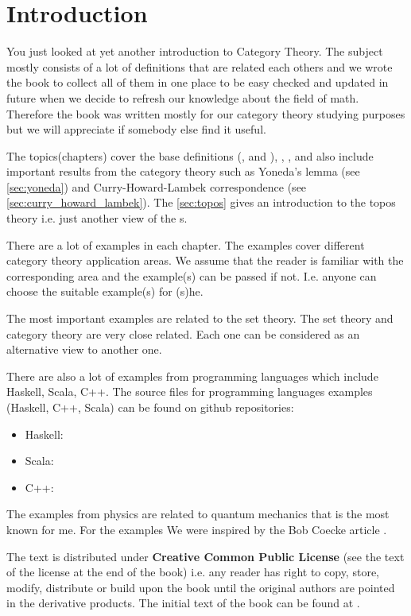 \chapter*{Introduction}

You just looked at yet another introduction to Category Theory. The
subject mostly consists of a lot of definitions that are related each
others and we wrote the book to collect all of them in one
place to be easy checked and updated in future when we decide to refresh
our knowledge about the field of math. Therefore the book was written mostly
for our category theory studying purposes but we will appreciate if
somebody else find it useful. 

The topics(chapters) cover the base definitions
(,  and
), ,
,  and also include important
results from the category theory such as Yoneda's lemma (see
\cref{sec:yoneda}) and Curry-Howard-Lambek correspondence (see
\cref{sec:curry_howard_lambek}). The \cref{sec:topos} gives an
introduction to the topos theory i.e. just another view of the
s.

There are a lot of examples in each chapter. The examples cover different category
theory application areas. We assume that the reader is familiar with
the corresponding area and the example(s) can be passed if not. I.e.
anyone can choose the suitable example(s) for (s)he. 

The most important examples are related to the set theory. The set
theory and category theory are very close related. Each one can be
considered as an alternative view to another one.

There are also a lot of examples from programming languages which include
Haskell, Scala, C++. The source files for programming languages 
examples (Haskell, C++, Scala) can be found on github repositories:
\begin{itemize}
\item Haskell: \cite{github:cattheory_hs_examples}
\item Scala: \cite{github:cattheory_scala_examples}
\item C++: \cite{github:cattheory_cpp_examples}
\end{itemize}

The examples from physics are related to quantum mechanics that is the
most known for me. For the examples We were inspired by the Bob Coecke
article \cite{bib:arxiv:Bob_Coecke_2008}.

The text is distributed under \textbf{Creative Common Public License}
(see the text of the license at the end of the book)
i.e. any reader has right to copy, store, modify, distribute or build
upon the book until the original authors are pointed in the derivative
products. The initial text of the book can be found at
\cite{github:cattheory_ivanmurashko}.  
